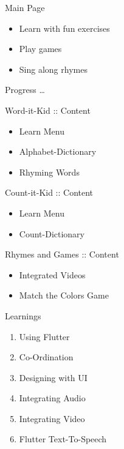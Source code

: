 \documentclass[14pt]{beamer}
\begin{document}
\begin{frame}{Main Page}
    \begin{itemize}
            \pause
        \item Learn with fun exercises \\
            \pause
        \item Play games \\
            \pause
        \item Sing along rhymes
    \end{itemize}
\end{frame}

\begin{frame}[standout]
    \alert{Progress \ldots}
\end{frame}

\begin{frame}{Word-it-Kid :: Content}
    \begin{itemize}
            \pause
	\item Learn Menu
	    \pause
        \item Alphabet-Dictionary
            \pause
	\item Rhyming Words
    \end{itemize}
\end{frame}

\begin{frame}{Count-it-Kid :: Content}
    \begin{itemize}
            \pause
        \item Learn Menu
            \pause
        \item Count-Dictionary
    \end{itemize}
\end{frame}

\begin{frame}{Rhymes and Games :: Content}
    \begin{itemize}
            \pause
        \item Integrated Videos
            \pause
        \item Match the Colors Game
    \end{itemize}
\end{frame}

\begin{frame}{Learnings}
    \begin{enumerate}
        \item Using Flutter
        \item Co-Ordination
        \item Designing with UI
	\item Integrating Audio
	\item Integrating Video
	\item Flutter Text-To-Speech
    \end{enumerate}
\end{frame}
\end{document}
